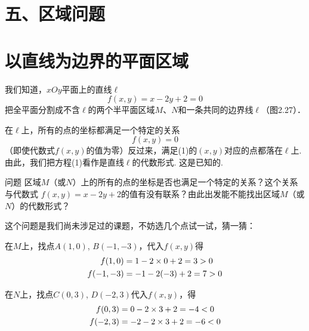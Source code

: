 \section*{五、区域问题}
\section{以直线为边界的平面区域}
我们知道，$xOy$平面上的直线$\ell$
\[f(x,y)=x-2y+2=0\]
把全平面分割成不含$\ell$的两个半平面区域$M$、$N$和一条共同的边界线$\ell$（图2.27）．

在$\ell$上，所有的点的坐标都满足一个特定的关系
\begin{equation}
    f(x,y)=0 \tag{1}    
\end{equation}
（即使代数式$f(x,y)$的值为零）反过来，满足(1)的$(x,y)$对应的点都落在$\ell$上. 由此，我们把方程(1)看作是直线$\ell$的代数形式. 这是已知的.

\begin{thm}
    {问题} 区域$M$（或$N$）上的所有的点的坐标是否也满足一个特定的关系？这个关系与代数式
$f(x,y)=x-2y+2$的值有没有联系？由此出发能不能找出区域$M$（或$N$）的代数形式？
\end{thm}


\noindent
\begin{minipage}{.5\textwidth}
\CTEXindent
这个问题是我们尚未涉足过的课题，不妨选几个点试一试，猜一猜：

在$M$上，找点$A(1,0)$, $B(-1,
-3)$，代入$f(x,y)$得
\[\begin{split}
 f(1,0)&=1-2\times0+2=3>0 \\
f(-1,-3)&=-1-2(-3)+2=7>0   
\end{split}\]

在$N$上，找点$C(0,3)$, $D(-2,3)$代入$f(x,y)$，得
\[\begin{split}
f(0,3)&=0-2\times 3+2=-4<0\\
f(-2,3)&=-2-2\times 3+2=-6<0    
\end{split}\]
\end{minipage}\hfill
\begin{minipage}{.45\textwidth}
    \centering
{}    
\end{minipage}


